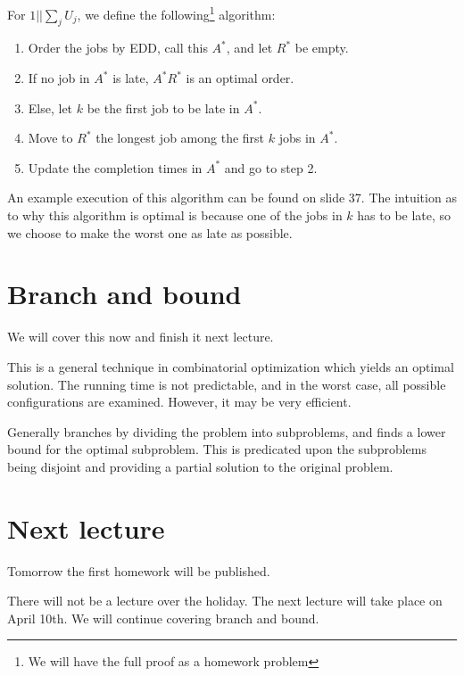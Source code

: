 \documentclass{idc_msc}
\begin{document}
For \(1||\sum_j U_j\), we define the following\footnote{We will have the full proof as a homework problem} algorithm\cite{moore1968n}:

\begin{enumerate}
  \item Order the jobs by EDD, call this \(A^*\), and let \(R^*\) be empty.
  \item If no job in \(A^*\) is late, \(A^* R^*\) is an optimal order.
  \item Else, let \(k\) be the first job to be late in \(A^*\).
  \item Move to \(R^*\) the longest job among the first \(k\) jobs in \(A^*\).
  \item Update the completion times in \(A^*\) and go to step 2.
\end{enumerate}

An example execution of this algorithm can be found on slide 37.
The intuition as to why this algorithm is optimal is because one of the jobs in \(k\) has to be late, so we choose to make the worst one as late as possible.

\section{Branch and bound}

We will cover this now and finish it next lecture.

This is a general technique in combinatorial optimization which yields an optimal solution.
The running time is not predictable, and in the worst case, all possible configurations are examined.
However, it may be very efficient.

Generally branches by dividing the problem into subproblems, and finds a lower bound for the optimal subproblem.
This is predicated upon the subproblems being disjoint and providing a partial solution to the original problem.

\section{Next lecture}

Tomorrow the first homework will be published.

There will not be a lecture over the holiday.
The next lecture will take place on April 10th.
We will continue covering branch and bound.
\end{document}

